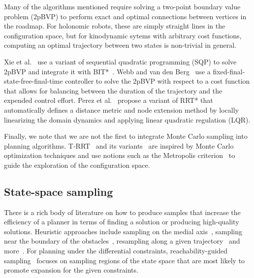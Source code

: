 \documentclass[letterpaper, 10 pt, conference]{ieeeconf}  %
\begin{document}
Many of the algorithms mentioned require solving a two-point boundary value problem (2pBVP) to perform exact and optimal connections between vertices in the roadmap.
For holonomic robots, these are simply straight lines in the configuration space, but for kinodynamic sytems with arbitrary cost functions,  computing an optimal trajectory between two states is non-trivial in general.

Xie et al.~\cite{XBPA15} use a variant of sequential quadratic programming (SQP) to solve 2pBVP and integrate it with BIT*~\cite{GSB15}.
Webb and van den Berg~\cite{WB13} use a fixed-final-state-free-final-time controller to solve the 2pBVP  with respect to a cost function that allows for balancing between the duration of the trajectory and the expended control effort.
Perez et al.~\cite{PPKKL12} propose a variant of RRT* that automatically defines a distance metric and node extension method by locally linearizing
the domain dynamics and applying linear quadratic regulation (LQR).

Finally, we note that we are not the first to integrate Monte Carlo sampling into planning algorithms. T-RRT~\cite{JCS10} and its variants~\cite{DSC13} are inspired by Monte Carlo optimization techniques and use notions such as the Metropolis criterion~\cite{CG95} to guide the exploration of the configuration space.

%


\subsection{State-space sampling}
\label{subsec:sampling}
There is a rich body of literature on how to produce samples that increase the efficiency of a planner in terms of finding a solution or producing high-quality solutions.
Heuristic approaches include
sampling on the medial axis~\cite{WAS99a, WAS99b, LTA03, YDLTA14},
sampling near the boundary of the obstacles~\cite{ABDJV98, YTEA12},
resampling along a given trajectory~\cite{APD11, AS11}
and more~\cite{US03, SWT09}.
For planning under the differential constraints,
reachability-guided sampling~\cite{SWT09, PLAEFRA17} focuses on sampling regions of the state space that are most likely to promote expansion for the given constraints.
\end{document}
